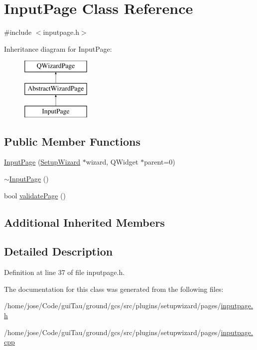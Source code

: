 \hypertarget{class_input_page}{\section{Input\-Page Class Reference}
\label{class_input_page}
}


{\ttfamily \#include $<$inputpage.\-h$>$}

Inheritance diagram for Input\-Page\-:\begin{figure}[H]
\begin{center}
\leavevmode
\includegraphics[height=3.000000cm]{class_input_page}
\end{center}
\end{figure}
\subsection*{Public Member Functions}
\begin{DoxyCompactItemize}
\item 
\hyperlink{group___input_page_ga1235bc645b12e53fe8cb3809353b7cfd}{Input\-Page} (\hyperlink{class_setup_wizard}{Setup\-Wizard} $\ast$wizard, Q\-Widget $\ast$parent=0)
\item 
\hyperlink{group___input_page_ga914e0c684267a45005618f8cc8f30fc5}{$\sim$\-Input\-Page} ()
\item 
bool \hyperlink{group___input_page_ga1bd59263f2a4bfb96d7ed395c118266d}{validate\-Page} ()
\end{DoxyCompactItemize}
\subsection*{Additional Inherited Members}


\subsection{Detailed Description}


Definition at line 37 of file inputpage.\-h.



The documentation for this class was generated from the following files\-:\begin{DoxyCompactItemize}
\item 
/home/jose/\-Code/gui\-Tau/ground/gcs/src/plugins/setupwizard/pages/\hyperlink{inputpage_8h}{inputpage.\-h}\item 
/home/jose/\-Code/gui\-Tau/ground/gcs/src/plugins/setupwizard/pages/\hyperlink{inputpage_8cpp}{inputpage.\-cpp}\end{DoxyCompactItemize}
